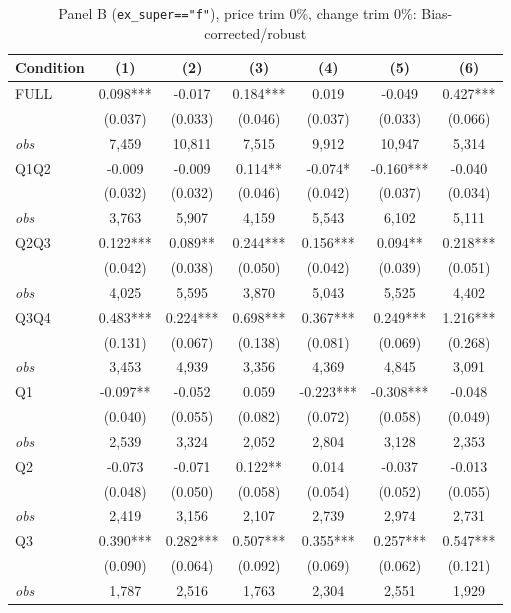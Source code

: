 \begin{table}[!htbp]
\centering
\caption{Panel B (\texttt{ex\_super=="f"}), price trim 0\%, change trim 0\%: Bias-corrected/robust}
\label{tab:b:trim00:robust}
\small
\begin{tabular}{lcccccc}
\toprule
Condition & (1) & (2) & (3) & (4) & (5) & (6) \\
\midrule
FULL & 0.098*** & -0.017 & 0.184*** & 0.019 & -0.049 & 0.427*** \\
 & (0.037) & (0.033) & (0.046) & (0.037) & (0.033) & (0.066) \\
\textit{obs} &  7,459 & 10,811 &  7,515 &  9,912 & 10,947 &  5,314 \\
Q1Q2 & -0.009 & -0.009 & 0.114** & -0.074* & -0.160*** & -0.040 \\
 & (0.032) & (0.032) & (0.046) & (0.042) & (0.037) & (0.034) \\
\textit{obs} & 3,763 & 5,907 & 4,159 & 5,543 & 6,102 & 5,111 \\
Q2Q3 & 0.122*** & 0.089** & 0.244*** & 0.156*** & 0.094** & 0.218*** \\
 & (0.042) & (0.038) & (0.050) & (0.042) & (0.039) & (0.051) \\
\textit{obs} & 4,025 & 5,595 & 3,870 & 5,043 & 5,525 & 4,402 \\
Q3Q4 & 0.483*** & 0.224*** & 0.698*** & 0.367*** & 0.249*** & 1.216*** \\
 & (0.131) & (0.067) & (0.138) & (0.081) & (0.069) & (0.268) \\
\textit{obs} & 3,453 & 4,939 & 3,356 & 4,369 & 4,845 & 3,091 \\
Q1 & -0.097** & -0.052 & 0.059 & -0.223*** & -0.308*** & -0.048 \\
 & (0.040) & (0.055) & (0.082) & (0.072) & (0.058) & (0.049) \\
\textit{obs} & 2,539 & 3,324 & 2,052 & 2,804 & 3,128 & 2,353 \\
Q2 & -0.073 & -0.071 & 0.122** & 0.014 & -0.037 & -0.013 \\
 & (0.048) & (0.050) & (0.058) & (0.054) & (0.052) & (0.055) \\
\textit{obs} & 2,419 & 3,156 & 2,107 & 2,739 & 2,974 & 2,731 \\
Q3 & 0.390*** & 0.282*** & 0.507*** & 0.355*** & 0.257*** & 0.547*** \\
 & (0.090) & (0.064) & (0.092) & (0.069) & (0.062) & (0.121) \\
\textit{obs} & 1,787 & 2,516 & 1,763 & 2,304 & 2,551 & 1,929 \\

\end{tabular}
\end{table}
